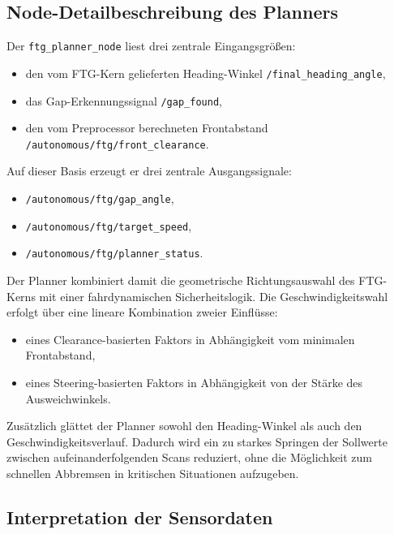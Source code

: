 \subsection{Node-Detailbeschreibung des Planners}

Der \texttt{ftg\_planner\_node} liest drei zentrale Eingangsgrößen:

\begin{itemize}
    \item den vom FTG-Kern gelieferten Heading-Winkel \texttt{/final\_heading\_angle},
    \item das Gap-Erkennungssignal \texttt{/gap\_found},
    \item den vom Preprocessor berechneten Frontabstand \texttt{/autonomous/ftg/front\_clearance}.
\end{itemize}

Auf dieser Basis erzeugt er drei zentrale Ausgangssignale:

\begin{itemize}
    \item \texttt{/autonomous/ftg/gap\_angle},
    \item \texttt{/autonomous/ftg/target\_speed},
    \item \texttt{/autonomous/ftg/planner\_status}.
\end{itemize}

Der Planner kombiniert damit die geometrische Richtungsauswahl des FTG-Kerns mit einer fahrdynamischen Sicherheitslogik. Die Geschwindigkeitswahl erfolgt über eine lineare Kombination zweier Einflüsse:

\begin{itemize}
    \item eines Clearance-basierten Faktors in Abhängigkeit vom minimalen Frontabstand,
    \item eines Steering-basierten Faktors in Abhängigkeit von der Stärke des Ausweichwinkels.
\end{itemize}

Zusätzlich glättet der Planner sowohl den Heading-Winkel als auch den Geschwindigkeitsverlauf. Dadurch wird ein zu starkes Springen der Sollwerte zwischen aufeinanderfolgenden Scans reduziert, ohne die Möglichkeit zum schnellen Abbremsen in kritischen Situationen aufzugeben.

\subsection{Interpretation der Sensordaten}

